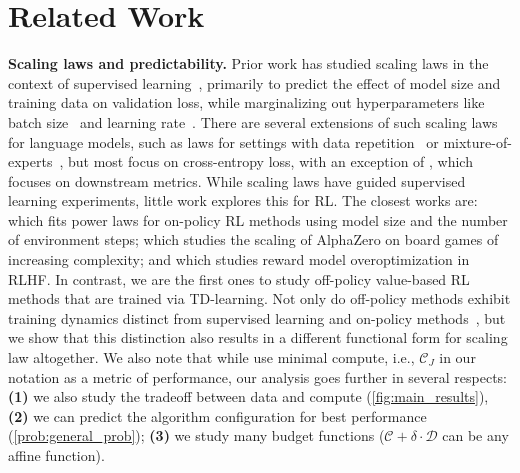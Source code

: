 \section{Related Work}
\vspace{-0.1cm}
\textbf{Scaling laws and predictability.} Prior work has studied scaling laws in the context of supervised learning~\citep{kaplan2020scaling,hoffmann2022training}, primarily to predict the effect of model size and training data on validation loss, while marginalizing out hyperparameters like batch size~\citep{mccandlish2018empirical} and learning rate~\citep{kaplan2020scaling}. There are several extensions of such scaling laws for language models, such as laws for settings with data repetition~\citep{muennighoff2023scaling} or mixture-of-experts~\citep{ludziejewskiscaling}, but most focus on cross-entropy loss, with an exception of \citet{gadre2024language}, which focuses on downstream metrics. While scaling laws have guided supervised learning experiments, little work explores this for RL. The closest works are: \citet{hilton2023scaling} which fits power laws for on-policy RL methods using model size and the number of environment steps; \citet{jones2021scalingscalinglawsboard} which studies the scaling of AlphaZero on board games of increasing complexity; and \citet{gao2023scaling} which studies reward model overoptimization in RLHF. In contrast, we are the first ones to study off-policy value-based RL methods that are trained via TD-learning. Not only do off-policy methods exhibit training dynamics distinct from supervised learning and on-policy methods~\citep{kumar2021dr3,lyle2023understanding}, but we show that this distinction also results in a different functional form for scaling law altogether. We also note that while \citet{hilton2023scaling} use minimal compute, i.e., $\mathcal{C}_J$ in our notation as a metric of performance, our analysis goes further in several respects: \textbf{(1)} we also study the tradeoff between data and compute (\cref{fig:main_results}), \textbf{(2)} we can predict the algorithm configuration for best performance (\cref{prob:general_prob}); \textbf{(3)} we study many budget functions ($\mathcal{C} + \delta \cdot \mathcal{D}$ can be any affine function).


